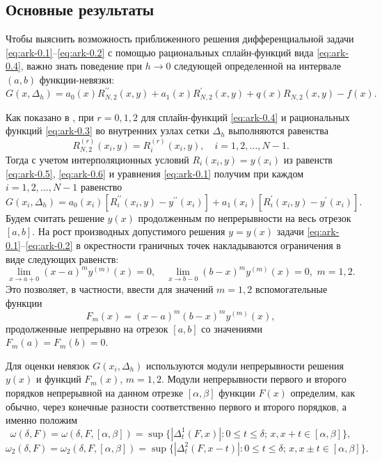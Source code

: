 \subsection{Основные результаты}

Чтобы выяснить возможность приближенного решения дифференциальной задачи
\eqref{eq:ark-0.1}--\eqref{eq:ark-0.2} с помощью рациональных сплайн-функций вида \eqref{eq:ark-0.4},
важно знать поведение при $h\to 0$ следующей определенной на интервале $(a,b)$
функции-невязки:
\begin{equation}\label{eq:ark-0.5}
G(x, \Delta_h)=a_0(x)R_{N,2}^{\prime\prime}(x,y)+a_1(x)R_{N,2}^\prime(x,y)+
q(x)R_{N,2}(x,y)-f(x).
\end{equation}

Как показано в \cite{bib:ark-12}, при $r=0,1,2$ для сплайн-функций \eqref{eq:ark-0.4} и рациональных
функций \eqref{eq:ark-0.3} во внутренних узлах сетки $\Delta_h$ выполняются равенства
\begin{equation}\label{eq:ark-0.6}
R_{N,2}^{(r)}(x_i,y)=R_i^{(r)}(x_i,y),\quad i=1,2,\dots,N-1.
\end{equation}
Тогда с учетом интерполяционных условий $R_i(x_i,y)=y(x_i)$ из равенств \eqref{eq:ark-0.5},
\eqref{eq:ark-0.6} и уравнения \eqref{eq:ark-0.1} получим при каждом $i=1,2,\dots,N-1$ равенство
\begin{equation*}\label{eq:ark-0.7}
G(x_i,\Delta_h)=a_0(x_i)[R_i^{\prime\prime}(x_i,y)-y^{\prime\prime}(x_i)]+
a_1(x_i)[R_i^\prime(x_i,y)-y^\prime(x_i)].
\end{equation*}
Будем считать решение $y(x)$ продолженным по непрерывности на весь отрезок
$[a,b]$. На рост производных допустимого
решения $y=y(x)$ задачи \eqref{eq:ark-0.1}--\eqref{eq:ark-0.2} в окрестности граничных точек
накладываются ограничения в виде следующих равенств:
\begin{equation}\label{eq:ark-0.10}
\lim_{x\to a+0}(x-a)^m y^{(m)}(x)=0,\quad \lim_{x\to b-0}(b-x)^my^{(m)}(x)=0,
\,\, m=1,2.
\end{equation}
Это позволяет, в частности, ввести для значений $m=1,2$  вспомогательные функции
\begin{equation*}\label{eq:ark-0.11}
F_m(x)=(x-a)^m(b-x)^m y^{(m)}(x),
\end{equation*}
продолженные непрерывно на отрезок $[a,b]$ со значениями $F_m(a)=F_m(b)=0$.

Для оценки невязок $G(x_i, \Delta_h)$ используются модули непрерывности решения $y(x)$
и функций $F_m(x)$, $m=1,2$.
Модули непрерывности первого и второго порядков непрерывной на данном отрезке
$[\alpha, \beta]$ функции $F(x)$ определим, как обычно, через конечные разности
соответственно первого и второго порядков, а именно положим
$$
\omega(\delta, F)=\omega(\delta, F,[\alpha,\beta])=\sup\{|\Delta_t^1(F, x)|:
 0\leqslant t\leqslant \delta;\, x, x+t\in[\alpha, \beta]\},
$$
$$
\omega_2(\delta, F)=\omega_2(\delta, F,[\alpha,\beta])=\sup\{|\Delta_t^2(F, x-t)|:
 0\leqslant t\leqslant \delta; \,x, x\pm t\in[\alpha, \beta]\}.
$$

